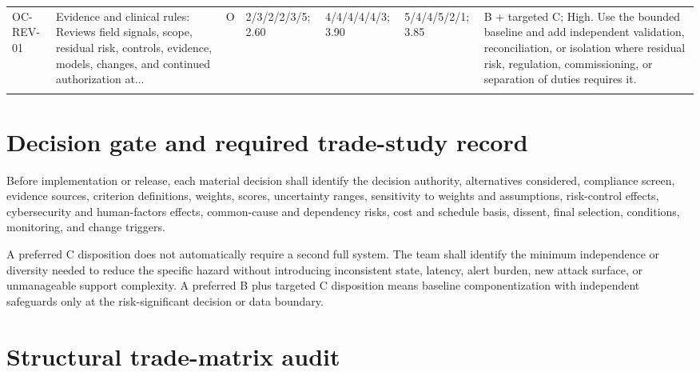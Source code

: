 \documentclass[11pt,letterpaper]{article}
\begin{document}
\begin{scriptsize}
\begin{longtable}{@{}L{0.11\textwidth}L{0.165\textwidth}L{0.04\textwidth}L{0.115\textwidth}L{0.115\textwidth}L{0.115\textwidth}L{0.235\textwidth}@{}}
\addlinespace[2pt]
OC-REV-01 & Evidence and clinical rules: Reviews field signals, scope, residual risk, controls, evidence, models, changes, and continued authorization at... & O & 2/3/2/2/3/5; 2.60 & 4/4/4/4/4/3; 3.90 & 5/4/4/5/2/1; 3.85 & B + targeted C; High. Use the bounded baseline and add independent validation, reconciliation, or isolation where residual risk, regulation, commissioning, or separation of duties requires it. \\
\addlinespace[2pt]
\end{longtable}
\end{scriptsize}

\section{Decision gate and required trade-study record}

Before implementation or release, each material decision shall identify the decision authority, alternatives considered, compliance screen, evidence sources, criterion definitions, weights, scores, uncertainty ranges, sensitivity to weights and assumptions, risk-control effects, cybersecurity and human-factors effects, common-cause and dependency risks, cost and schedule basis, dissent, final selection, conditions, monitoring, and change triggers.

A preferred C disposition does not automatically require a second full system. The team shall identify the minimum independence or diversity needed to reduce the specific hazard without introducing inconsistent state, latency, alert burden, new attack surface, or unmanageable support complexity. A preferred B plus targeted C disposition means baseline componentization with independent safeguards only at the risk-significant decision or data boundary.

\section{Structural trade-matrix audit}
\end{document}
